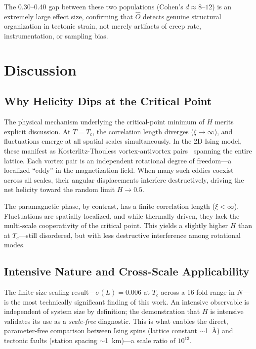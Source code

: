 \documentclass[aps,prl,twocolumn,superscriptaddress,byrevtex]{article}
\begin{document}
The 0.30--0.40 gap between these two populations (Cohen's $d \approx 8$--$12$) is
an extremely large effect size, confirming that $\hat{O}$ detects genuine
structural organization in tectonic strain, not merely artifacts of creep rate,
instrumentation, or sampling bias.

\section{Discussion}

\subsection{Why Helicity Dips at the Critical Point}

The physical mechanism underlying the critical-point minimum of $H$ merits
explicit discussion. At $T = T_c$, the correlation length diverges ($\xi \to \infty$),
and fluctuations emerge at all spatial scales simultaneously. In the 2D Ising
model, these manifest as Kosterlitz-Thouless vortex-antivortex pairs~\cite{kt1973}
spanning the entire lattice. Each vortex pair is an independent rotational
degree of freedom---a localized ``eddy'' in the magnetization field. When many
such eddies coexist across all scales, their angular displacements interfere
destructively, driving the net helicity toward the random limit $H \to 0.5$.

The paramagnetic phase, by contrast, has a finite correlation length ($\xi < \infty$).
Fluctuations are spatially localized, and while thermally driven, they lack the
multi-scale cooperativity of the critical point. This yields a slightly higher
$H$ than at $T_c$---still disordered, but with less destructive interference
among rotational modes.

\subsection{Intensive Nature and Cross-Scale Applicability}

The finite-size scaling result---$\sigma(L) = 0.006$ at $T_c$ across a 16-fold
range in $N$---is the most technically significant finding of this work. An
intensive observable is independent of system size by definition; the
demonstration that $H$ is intensive validates its use as a \emph{scale-free}
diagnostic. This is what enables the direct, parameter-free comparison between
Ising spins (lattice constant $\sim$1~\AA) and tectonic faults (station spacing
$\sim$1~km)---a scale ratio of $10^{13}$.
\end{document}
